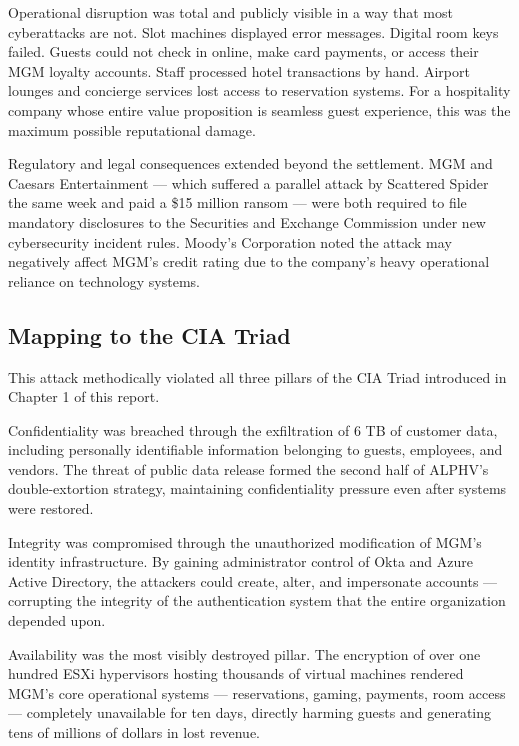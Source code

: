Operational disruption was total and publicly visible in a way that most cyberattacks are not. Slot machines displayed error messages. Digital room keys failed. Guests could not check in online, make card payments, or access their MGM loyalty accounts. Staff processed hotel transactions by hand. Airport lounges and concierge services lost access to reservation systems. For a hospitality company whose entire value proposition is seamless guest experience, this was the maximum possible reputational damage.

Regulatory and legal consequences extended beyond the settlement. MGM and Caesars Entertainment — which suffered a parallel attack by Scattered Spider the same week and paid a \$15 million ransom — were both required to file mandatory disclosures to the Securities and Exchange Commission under new cybersecurity incident rules. Moody's Corporation noted the attack may negatively affect MGM's credit rating due to the company's heavy operational reliance on technology systems.



\subsection{Mapping to the CIA Triad}

This attack methodically violated all three pillars of the CIA Triad introduced in Chapter 1 of this report.

Confidentiality was breached through the exfiltration of 6 TB of customer data, including personally identifiable information belonging to guests, employees, and vendors. The threat of public data release formed the second half of ALPHV's double-extortion strategy, maintaining confidentiality pressure even after systems were restored.

Integrity was compromised through the unauthorized modification of MGM's identity infrastructure. By gaining administrator control of Okta and Azure Active Directory, the attackers could create, alter, and impersonate accounts — corrupting the integrity of the authentication system that the entire organization depended upon.

Availability was the most visibly destroyed pillar. The encryption of over one hundred ESXi hypervisors hosting thousands of virtual machines rendered MGM's core operational systems — reservations, gaming, payments, room access — completely unavailable for ten days, directly harming guests and generating tens of millions of dollars in lost revenue.

